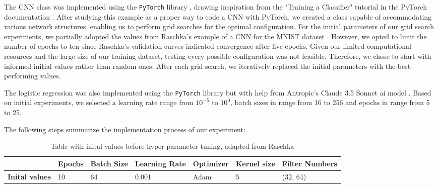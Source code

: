 The CNN class was implemented using the \texttt{PyTorch} library \cite{Paszke2019}, drawing inspiration from the "Training a Classifier" tutorial in the PyTorch documentation \cite{pytorch_cifar10_tutorial}. After studying this example as a proper way to code a CNN with PyTorch, we created a class capable of accommodating various network structures, enabling us to perform grid searches for the optimal configuration. For the initial parameters of our grid search experiments, we partially adopted the values from Raschka's example of a CNN for the MNIST dataset \cite{raschka2022machine}. However, we opted to limit the number of epochs to ten since Raschka's validation curves indicated convergence after five epochs. Given our limited computational resources and the large size of our training dataset, testing every possible configuration was not feasible. Therefore, we chose to start with informed initial values rather than random ones. After each grid search, we iteratively replaced the initial parameters with the best-performing values.

The logistic regression was also implemented using the \texttt{PyTorch} library but with help from Antropic's Claude 3.5 Sonnet ai model \cite{anthropic_claude_3_5_sonnet}. Based on initial experiments, we selected a learning rate range from \( 10^{-5}\) to \( 10^0 \), batch sizes in range from 16 to 256 and epochs in range from 5 to 25. 

The following steps summarize the implementation process of our experiment:

\begin{table}[h]
    \centering
    \caption{Table with inital values before hyper parameter tuning, adapted from Raschka \cite{raschka2022machine}}
    
\begin{tabular}{|l|l|l|l|l|l|l|}
\hline
                       & \textbf{Epochs} & \textbf{Batch Size} & \textbf{Learning Rate} & \textbf{Optimizer} & \textbf{Kernel size} & \textbf{Filter Numbers} \\ \hline
\textbf{Inital values} & 10              & 64                  & 0.001                  & Adam               & 5                    & (32, 64)                \\ \hline
\end{tabular}
\end{table}

